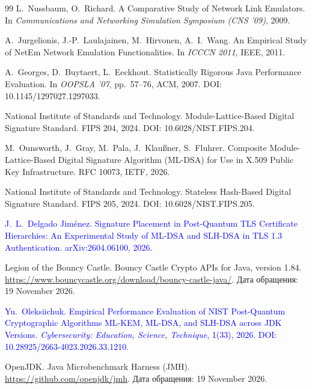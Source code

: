 \documentclass[conference,a4paper]{IEEEtran}
\newcommand{\newtext}[1]{{\color{blue}#1}}
\begin{document}
\begin{thebibliography}{99}
L.~Nussbaum, O.~Richard.
\newblock A Comparative Study of Network Link Emulators.
\newblock In \emph{Communications and Networking Simulation Symposium (CNS '09)}, 2009.

A.~Jurgelionis, J.-P.~Laulajainen, M.~Hirvonen, A.~I.~Wang.
\newblock An Empirical Study of NetEm Network Emulation Functionalities.
\newblock In \emph{ICCCN 2011}, IEEE, 2011.

A.~Georges, D.~Buytaert, L.~Eeckhout.
\newblock Statistically Rigorous Java Performance Evaluation.
\newblock In \emph{OOPSLA '07}, pp.~57--76, ACM, 2007.
\newblock DOI: 10.1145/1297027.1297033.

National Institute of Standards and Technology.
\newblock Module-Lattice-Based Digital Signature Standard.
\newblock FIPS 204, 2024.
\newblock DOI: 10.6028/NIST.FIPS.204.

M.~Ounsworth, J.~Gray, M.~Pala, J.~Klau{\ss}ner, S.~Fluhrer.
\newblock Composite Module-Lattice-Based Digital Signature Algorithm (ML-DSA) for Use in X.509
Public Key Infrastructure.
\newblock RFC 10073, IETF, 2026.

National Institute of Standards and Technology.
\newblock Stateless Hash-Based Digital Signature Standard.
\newblock FIPS 205, 2024.
\newblock DOI: 10.6028/NIST.FIPS.205.

\textcolor{blue}{J.~L.~Delgado Jim{\'e}nez.
\newblock Signature Placement in Post-Quantum TLS Certificate Hierarchies: An Experimental Study of
ML-DSA and SLH-DSA in TLS 1.3 Authentication.
\newblock arXiv:2604.06100, 2026.}

\newtext{Legion of the Bouncy Castle.
\newblock Bouncy Castle Crypto APIs for Java, version 1.84.
\newblock \url{https://www.bouncycastle.org/download/bouncy-castle-java/}.
\newblock Дата обращения: 19 November 2026.}

\textcolor{blue}{Yu.~Oleksiichuk.
\newblock Empirical Performance Evaluation of NIST Post-Quantum Cryptographic Algorithms ML-KEM, ML-DSA,
and SLH-DSA across JDK Versions.
\newblock \emph{Cybersecurity: Education, Science, Technique}, 1(33), 2026.
\newblock DOI: 10.28925/2663-4023.2026.33.1210.}

\newtext{OpenJDK.
\newblock Java Microbenchmark Harness (JMH).
\newblock \url{https://github.com/openjdk/jmh}.
\newblock Дата обращения: 19 November 2026.}


\end{thebibliography}
\end{document}
